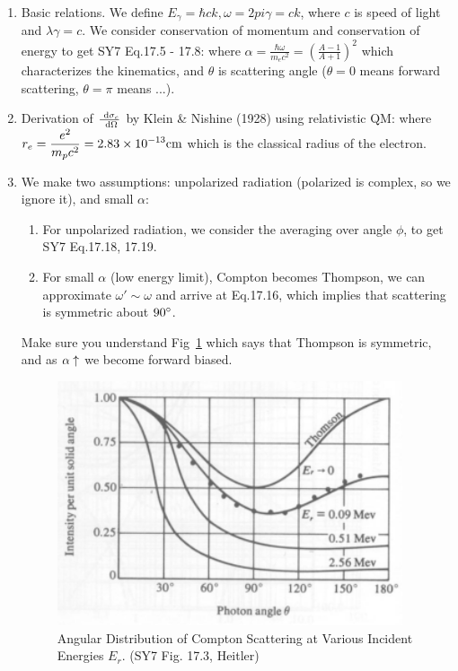 \documentclass{school-22.101-notes}
\begin{document}
\begin{enumerate}
\item Basic relations. We define $E_{\gamma} = \hbar c k, \omega = 2 pi \gamma = ck$, where $c$ is speed of light and $\lambda \gamma = c$. We consider conservation of momentum and conservation of energy to get SY7 Eq.17.5 - 17.8: 
where $\alpha = \frac{\hbar \omega}{m_e c^2} = \left( \frac{A-1}{A+1} \right)^2$ which characterizes the kinematics, and $\theta$ is scattering angle ($\theta = 0$ means forward scattering, $\theta = \pi$ means ...). 

\item Derivation of $\frac{\mbox{ }\mathrm{d} \sigma_c}{\mbox{ }\mathrm{d} \Omega}$ by Klein \& Nishine (1928) using relativistic QM: 
where $\displaystyle r_e = \frac{e^2}{m_p c^2} = 2.83 \times 10^{-13} \mathrm{cm}$ which is the classical radius of the electron. 

\item We make two assumptions: unpolarized radiation (polarized is complex, so we ignore it), and small $\alpha$: 
\begin{enumerate}
\item For unpolarized radiation, we consider the averaging over angle $\phi$, to get SY7 Eq.17.18, 17.19.

\item For small $\alpha$ (low energy limit), Compton becomes Thompson, we can approximate $\omega' \sim \omega$ and arrive at Eq.17.16, 
which implies that scattering is symmetric about $90^{\circ}$. 
\end{enumerate}
Make sure you understand Fig~\ref{17.3} which says that Thompson is symmetric, and as $\alpha \uparrow$ we become forward biased. 
\begin{figure}
  \centering
  \includegraphics[width=4in]{images/ni/17.3.png}
  \caption{Angular Distribution of Compton Scattering at Various Incident Energies $E_r$. (SY7 Fig. 17.3, Heitler)} \label{17.3}
\end{figure}


\end{enumerate}
\end{document}
